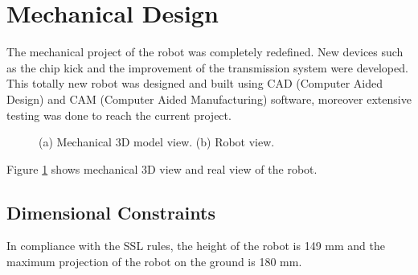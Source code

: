 \section{Mechanical Design}

The mechanical project of the robot was completely redefined. New devices such as the chip kick and the improvement of the transmission system were developed. This totally new robot was designed and built using CAD (Computer Aided Design) and CAM (Computer Aided Manufacturing) software, moreover extensive testing was done to reach the current project.

\begin{figure}[thpb]
	\centering
	\caption{(a) Mechanical 3D model view. (b) Robot view.}
	\label{mec}
\end{figure}

Figure \ref{mec} shows mechanical
3D view and real view of the robot.

\subsection{Dimensional Constraints}

In compliance with the SSL rules, the height of the robot is 149 mm and the maximum projection of the robot on the ground is 180 mm.

